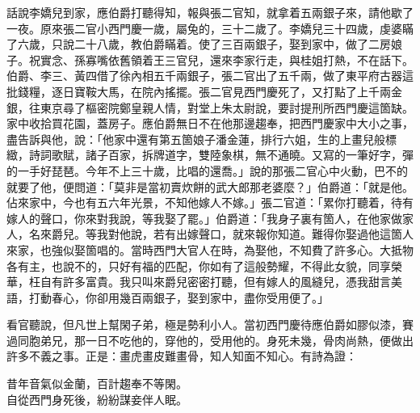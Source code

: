話說李嬌兒到家，應伯爵打聽得知，報與張二官知，就拿着五兩銀子來，請他歇了一夜。原來張二官小西門慶一歲，屬兔的，三十二歲了。李嬌兒三十四歲，虔婆瞞了六歲，只說二十八歲，教伯爵瞞着。使了三百兩銀子，娶到家中，做了二房娘子。祝實念、孫寡嘴依舊領着王三官兒，還來李家行走，與桂姐打熱，不在話下。{}伯爵、李三、黃四借了徐內相五千兩銀子，張二官出了五千兩，做了東平府古器這批錢糧，逐日寶鞍大馬，在院內搖擺。張二官見西門慶死了，又打點了上千兩金銀，往東京尋了樞密院鄭皇親人情，對堂上朱太尉說，要討提刑所西門慶這箇缺。家中收拾買花園，蓋房子。應伯爵無日不在他那邊趨奉，把西門慶家中大小之事，盡告訴與他，{}說：「他家中還有第五箇娘子潘金蓮，排行六姐，生的上畫兒般標緻，詩詞歌賦，諸子百家，拆牌道字，雙陸象棋，無不通曉。又寫的一筆好字，彈的一手好琵琶。今年不上三十歲，比唱的還喬。」說的那張二官心中火動，巴不的就要了他，便問道：「莫非是當初賣炊餅的武大郎那老婆麼？」伯爵道：「就是他。佔來家中，今也有五六年光景，不知他嫁人不嫁。」張二官道：「累你打聽着，待有嫁人的聲口，你來對我說，等我娶了罷。」伯爵道：「我身子裏有箇人，在他家做家人，名來爵兒。等我對他說，若有出嫁聲口，就來報你知道。難得你娶過他這箇人來家，也強似娶箇唱的。當時西門大官人在時，為娶他，不知費了許多心。大抵物各有主，也說不的，只好有福的匹配，你如有了這般勢耀，不得此女貌，同享榮華，枉自有許多富貴。我只叫來爵兒密密打聽，但有嫁人的風縫兒，憑我甜言美語，打動春心，你卻用幾百兩銀子，娶到家中，盡你受用便了。」

看官聽說，但凡世上幫閑子弟，極是勢利小人。當初西門慶待應伯爵如膠似漆，賽過同胞弟兄，那一日不吃他的，穿他的，受用他的。身死未幾，骨肉尚熱，便做出許多不義之事。{}正是：畫虎畫皮難畫骨，知人知面不知心。有詩為證：

\begin{myquote}
昔年音氣似金蘭，百計趨奉不等閑。\\自從西門身死後，紛紛謀妾伴人眠。
\end{myquote}

